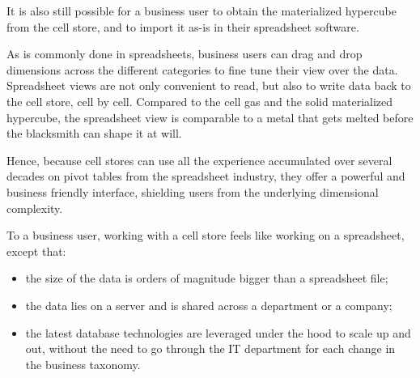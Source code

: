 \documentclass{acm_proc_article-sp}
\begin{document}
It is also still possible for a business user to obtain the materialized hypercube from the cell store, and to import it as-is in their spreadsheet software.

As is commonly done in spreadsheets, business users can drag and drop dimensions across the different categories to fine tune their view over the data. Spreadsheet views are not only convenient to read, but also to write data back to the cell store, cell by cell. Compared to the cell gas and the solid materialized hypercube, the spreadsheet view is comparable to a metal that gets melted before the blacksmith can shape it at will.

Hence, because cell stores can use all the experience accumulated over several decades on pivot tables from the spreadsheet industry, they offer a powerful and business friendly interface, shielding users from the underlying dimensional complexity.

To a business user, working with a cell store feels like working on a spreadsheet, except that:

\begin{itemize}
\item the size of the data is orders of magnitude bigger than a spreadsheet file;
\item the data lies on a server and is shared across a department or a company;
\item the latest database technologies are leveraged under the hood to scale up and out, without the need to go through the IT department for each change in the business taxonomy.
\end{itemize}
\end{document}
